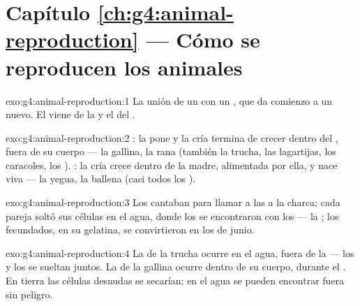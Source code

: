 \section*{Capítulo \ref{ch:g4:animal-reproduction} --- Cómo se reproducen los animales}

\begin{solution}{exo:g4:animal-reproduction:1}
La unión de un  con un , que da comienzo a un
 nuevo. El  viene de la  y el  del
.
\end{solution}

\begin{solution}{exo:g4:animal-reproduction:2}
: la  pone  y la cría termina de crecer dentro del
, fuera de su cuerpo --- la gallina, la rana (también la trucha,
las lagartijas, los caracoles, los ). : la cría crece
dentro de la madre, alimentada por ella, y nace viva --- la yegua, la
ballena (casi todos los ).
\end{solution}

\begin{solution}{exo:g4:animal-reproduction:3}
Los  cantaban para llamar a las  a la charca; cada pareja
soltó sus células en el agua, donde los  se encontraron
con los  --- la ; los  fecundados, en su
gelatina, se convirtieron en los  de junio.
\end{solution}

\begin{solution}{exo:g4:animal-reproduction:4}
La de la trucha ocurre en el agua, fuera de la  --- los  y
los  se sueltan juntos. La de la gallina ocurre dentro
de su cuerpo, durante el . En tierra las células desnudas
se secarían; en el agua se pueden encontrar fuera sin peligro.
\end{solution}

